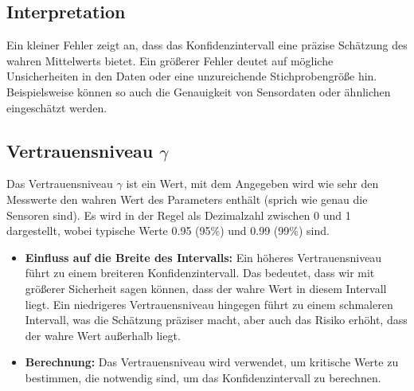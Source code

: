 \subsection*{Interpretation}
Ein kleiner Fehler zeigt an, dass das Konfidenzintervall eine präzise Schätzung des wahren Mittelwerts bietet. Ein größerer Fehler deutet auf mögliche Unsicherheiten in den Daten oder eine unzureichende Stichprobengröße hin. Beispielsweise können so auch die Genauigkeit von Sensordaten oder ähnlichen eingeschätzt werden. 


\subsection{Vertrauensniveau $\gamma$}
\label{sec:vertrauensniveau}
Das Vertrauensniveau \(\gamma\) ist ein Wert, mit dem Angegeben wird wie sehr den Messwerte den wahren Wert des Parameters enthält (sprich wie genau die Sensoren sind). Es wird in der Regel als Dezimalzahl zwischen 0 und 1 dargestellt, wobei typische Werte 0.95 (95\%) und 0.99 (99\%) sind.

\begin{itemize}
    \item \textbf{Einfluss auf die Breite des Intervalls:} Ein höheres Vertrauensniveau führt zu einem breiteren Konfidenzintervall. Das bedeutet, dass wir mit größerer Sicherheit sagen können, dass der wahre Wert in diesem Intervall liegt. Ein niedrigeres Vertrauensniveau hingegen führt zu einem schmaleren Intervall, was die Schätzung präziser macht, aber auch das Risiko erhöht, dass der wahre Wert außerhalb liegt.
    
    \item \textbf{Berechnung:} Das Vertrauensniveau wird verwendet, um kritische Werte zu bestimmen, die notwendig sind, um das Konfidenzintervall zu berechnen. 
\end{itemize}


